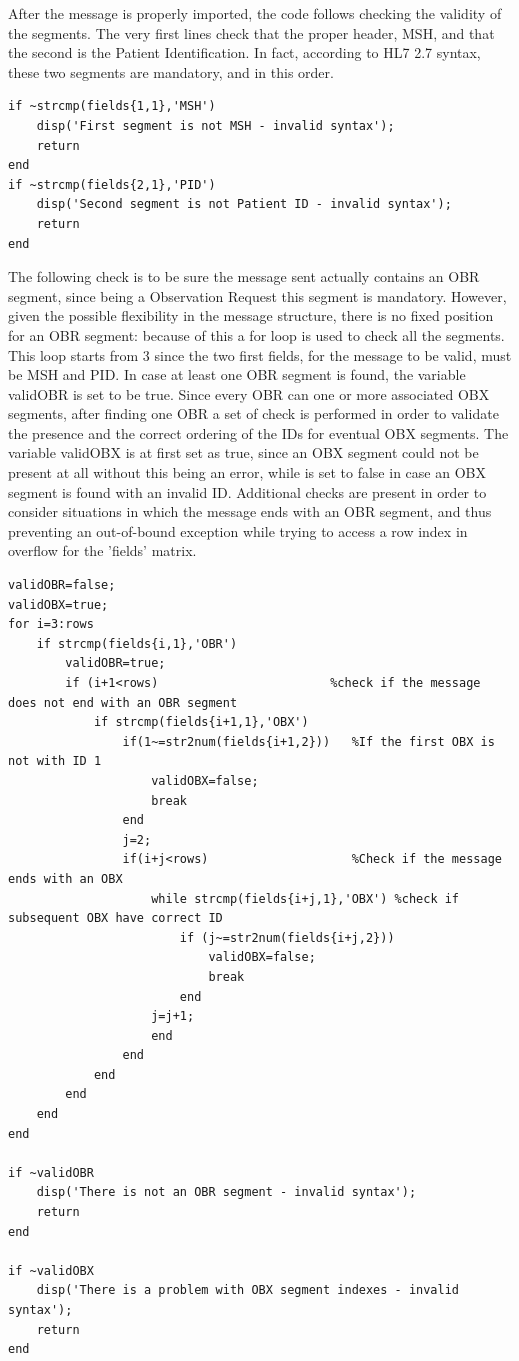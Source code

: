 \documentclass[a4paper,titlepage]{article}
\begin{document}
After the message is properly imported, the code follows checking the validity of the segments. The very first lines check that the proper header, MSH, and that the second is the Patient Identification. In fact, according to HL7 2.7 syntax, these two segments are mandatory, and in this order.

\begin{lstlisting}[caption=Validity of MSH and PID segments]
if ~strcmp(fields{1,1},'MSH')
    disp('First segment is not MSH - invalid syntax');
    return
end
if ~strcmp(fields{2,1},'PID')
    disp('Second segment is not Patient ID - invalid syntax');
    return
end
\end{lstlisting}

The following check is to be sure the message sent actually contains an OBR segment, since being a Observation Request this segment is mandatory.
However, given the possible flexibility in the message structure, there is no fixed position for an OBR segment: because of this a for loop is used to check all the segments. This loop starts from 3 since the two first fields, for the message to be valid, must be MSH and PID. In case at least one OBR segment is found, the variable validOBR is set to be true.
Since every OBR can one or more associated OBX segments, after finding one OBR a set of check is performed in order to validate the presence and the correct ordering of the IDs for eventual OBX segments.
The variable validOBX is at first set as true, since an OBX segment could not be present at all without this being an error, while is set to false in case an OBX segment is found with an invalid ID.
Additional checks are present in order to consider situations in which the message ends with an OBR segment, and thus preventing an out-of-bound exception while trying to access a row index in overflow for the 'fields' matrix.

\begin{lstlisting}[caption=Validity of OBR/OBX segments]
%There should be at least one OBR segment, if there are any 
validOBR=false;
validOBX=true;
for i=3:rows
    if strcmp(fields{i,1},'OBR')
        validOBR=true;
        if (i+1<rows)                        %check if the message does not end with an OBR segment
            if strcmp(fields{i+1,1},'OBX')
                if(1~=str2num(fields{i+1,2}))   %If the first OBX is not with ID 1
                    validOBX=false;
                    break
                end
                j=2;
                if(i+j<rows)                    %Check if the message ends with an OBX
                    while strcmp(fields{i+j,1},'OBX') %check if subsequent OBX have correct ID
                        if (j~=str2num(fields{i+j,2}))
                            validOBX=false;
                            break
                        end
                    j=j+1;    
                    end
                end
            end
        end
    end
end

if ~validOBR
    disp('There is not an OBR segment - invalid syntax');
    return
end

if ~validOBX
    disp('There is a problem with OBX segment indexes - invalid syntax');
    return
end
\end{lstlisting}
\end{document}

